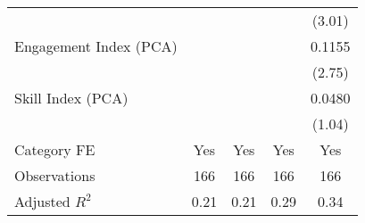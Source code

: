 {\begin{tabular}{l*{4}{c}}
                                   &                   &                   &                   &    (3.01)         \\
[1em]
Engagement Index (PCA)             &                   &                   &                   &    0.1155\sym{***}\\
                                   &                   &                   &                   &    (2.75)         \\
[1em]
Skill Index (PCA)                  &                   &                   &                   &    0.0480         \\
                                   &                   &                   &                   &    (1.04)         \\
[1em]
Category FE                        &       Yes         &       Yes         &       Yes         &       Yes         \\
\hline
Observations                       &       166         &       166         &       166         &       166         \\
Adjusted \(R^{2}\)                 &      0.21         &      0.21         &      0.29         &      0.34         \\
\hline\hline
\end{tabular}
}
